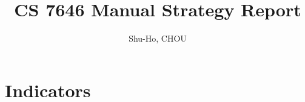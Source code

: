 \documentclass[a4paper]{article}
\title{CS 7646 Manual Strategy Report}
\author{Shu-Ho, CHOU}
\begin{document}
\maketitle
%
\section{Indicators}
\end{document}
